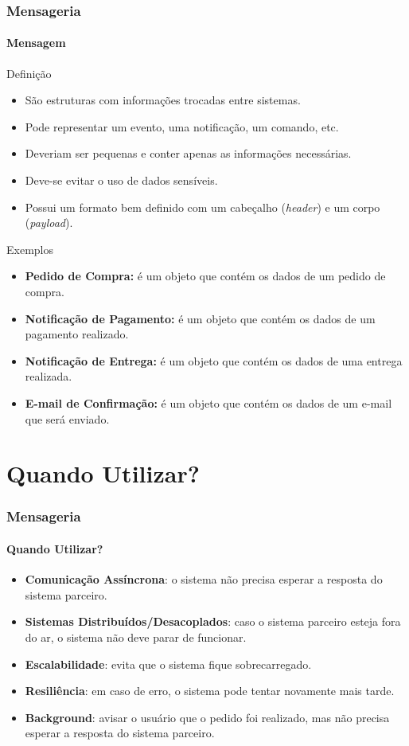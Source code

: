 \documentclass[
	9pt, %
	t, %
]{beamer}
\begin{document}
\begin{frame}
	\frametitle{Mensageria}
	\framesubtitle{Mensagem}

	\begin{block}{Definição}
		\begin{itemize}
			\item São estruturas com informações trocadas entre sistemas.
			\item Pode representar um evento, uma notificação, um comando, etc.
			\item Deveriam ser pequenas e conter apenas as informações necessárias.
			\item Deve-se evitar o uso de dados sensíveis.
			\item Possui um formato bem definido com um cabeçalho (\textit{header}) e um corpo (\textit{payload}).
		\end{itemize}
	\end{block}

	\begin{block}{Exemplos}
		\begin{itemize}
			\item \textbf{Pedido de Compra:} é um objeto que contém os dados de um pedido de compra.
			\item \textbf{Notificação de Pagamento:} é um objeto que contém os dados de um pagamento realizado.
			\item \textbf{Notificação de Entrega:} é um objeto que contém os dados de uma entrega realizada.
			\item \textbf{E-mail de Confirmação:} é um objeto que contém os dados de um e-mail que será enviado.
		\end{itemize}
	\end{block}
\end{frame}

\section{Quando Utilizar?}

\begin{frame}
	\frametitle{Mensageria}
	\framesubtitle{Quando Utilizar?}
	
	\begin{itemize}
		\item \textbf{Comunicação Assíncrona}: o sistema não precisa esperar a resposta do sistema parceiro.
		\item \textbf{Sistemas Distribuídos/Desacoplados}: caso o sistema parceiro esteja fora do ar, o sistema não deve parar de funcionar.
		\item \textbf{Escalabilidade}: evita que o sistema fique sobrecarregado.
		\item \textbf{Resiliência}: em caso de erro, o sistema pode tentar novamente mais tarde.
		\item \textbf{Background}: avisar o usuário que o pedido foi realizado, mas não precisa esperar a resposta do sistema parceiro.
	\end{itemize}

\end{frame}
\end{document}
